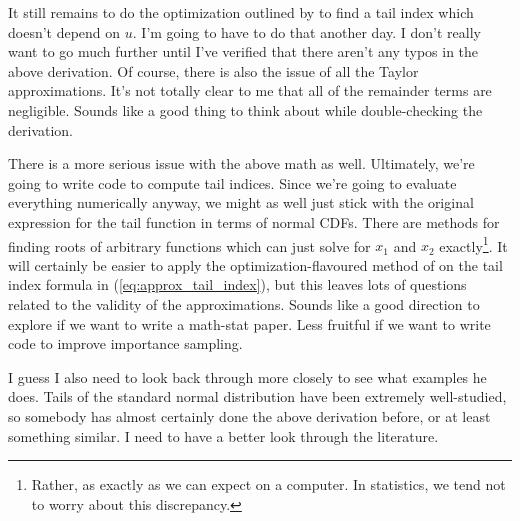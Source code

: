 \documentclass{article}
\begin{document}
It still remains to do the optimization outlined by \citet{Pic75} to find a tail index which doesn't depend on $u$. I'm going to have to do that another day. I don't really want to go much further until I've verified that there aren't any typos in the above derivation. Of course, there is also the issue of all the Taylor approximations. It's not totally clear to me that all of the remainder terms are negligible. Sounds like a good thing to think about while double-checking the derivation.

There is a more serious issue with the above math as well. Ultimately, we're going to write code to compute tail indices. Since we're going to evaluate everything numerically anyway, we might as well just stick with the original expression for the tail function in terms of normal CDFs. There are methods for finding roots of arbitrary functions which can just solve for $x_1$ and $x_2$ exactly\footnote{Rather, as exactly as we can expect on a computer. In statistics, we tend not to worry about this discrepancy.}. It will certainly be easier to apply the optimization-flavoured method of \citet{Pic75} on the tail index formula in (\ref{eq:approx_tail_index}), but this leaves lots of questions related to the validity of the approximations. Sounds like a good direction to explore if we want to write a math-stat paper. Less fruitful if we want to write code to improve importance sampling. 

I guess I also need to look back through \citet{Pic75} more closely to see what examples he does. Tails of the standard normal distribution have been extremely well-studied, so somebody has almost certainly done the above derivation before, or at least something similar. I need to have a better look through the literature.





\end{document}
